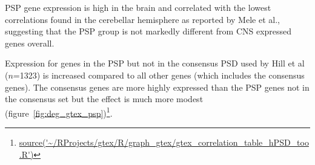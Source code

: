 PSP gene expression is high in the brain and correlated with the lowest correlations found in the cerebellar hemisphere as reported by Mele et al.\cite{mele2015human}, suggesting that the PSP group is not markedly different from CNS expressed genes overall. 

Expression for genes in the PSP but not in the consensus PSD used by Hill et al\cite{hill2014human} ($n$=1323)  is increased compared to all other genes (which includes the consensus genes). The consensus genes are more highly expressed than the PSP genes not in the consensus set but the effect is much more modest (figure~\ref{fig:deg_gtex_psp})\footnote{\url{source('~/RProjects/gtex/R/graph_gtex/gtex_correlation_table_hPSD_too.R')}}.



